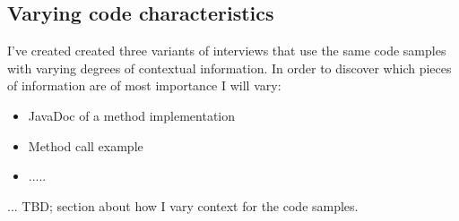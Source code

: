 \subsection{Varying code characteristics}
I've created created three variants of interviews that use the same code samples with varying degrees of contextual information. In order to discover which pieces of information are of most importance I will vary:

\begin{itemize}
\item JavaDoc of a method implementation
\item Method call example
\item .....
\end{itemize}

... TBD; section about how I vary context for the code samples.